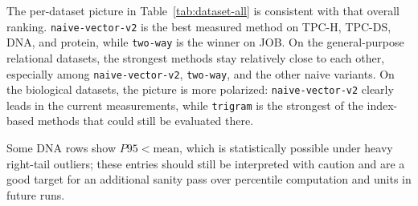 \documentclass[11pt]{article}
\begin{document}
The per-dataset picture in Table~\ref{tab:dataset-all} is consistent with that overall ranking. \texttt{naive-vector-v2} is the best measured method on TPC-H, TPC-DS, DNA, and protein, while \texttt{two-way} is the winner on JOB. On the general-purpose relational datasets, the strongest methods stay relatively close to each other, especially among \texttt{naive-vector-v2}, \texttt{two-way}, and the other naive variants. On the biological datasets, the picture is more polarized: \texttt{naive-vector-v2} clearly leads in the current measurements, while \texttt{trigram} is the strongest of the index-based methods that could still be evaluated there.

Some DNA rows show \(P95 < \text{mean}\), which is statistically possible under heavy right-tail outliers; these entries should still be interpreted with caution and are a good target for an additional sanity pass over percentile computation and units in future runs.
\end{document}
